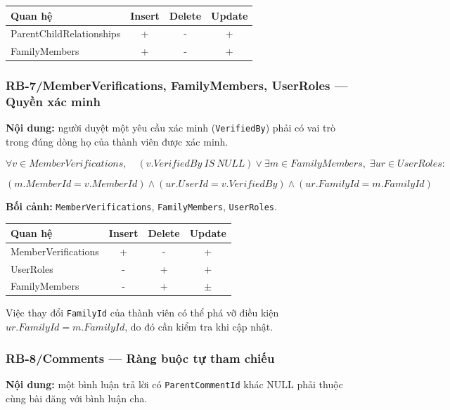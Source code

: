 \begin{center}
\begin{tabular}{@{}lccc@{}}
\toprule
\textbf{Quan hệ} & \textbf{Insert} & \textbf{Delete} & \textbf{Update}\\
\midrule
ParentChildRelationships & + & - & +\\
FamilyMembers & + & - & +\\
\bottomrule
\end{tabular}
\end{center}

\subsubsection*{RB-7/MemberVerifications, FamilyMembers, UserRoles --- Quyền xác minh}

\textbf{Nội dung:} người duyệt một yêu cầu xác minh (\texttt{VerifiedBy}) phải có vai trò trong đúng dòng họ của thành viên được xác minh.

\[
\forall v\in MemberVerifications,\quad
(v.VerifiedBy\ IS\ NULL)
\lor
\exists m\in FamilyMembers,\;
\exists ur\in UserRoles:
\]

\[
(m.MemberId=v.MemberId)
\land
(ur.UserId=v.VerifiedBy)
\land
(ur.FamilyId=m.FamilyId)
\]

\textbf{Bối cảnh:} \texttt{MemberVerifications}, \texttt{FamilyMembers}, \texttt{UserRoles}.

\begin{center}
\begin{tabular}{@{}lccc@{}}
\toprule
\textbf{Quan hệ} & \textbf{Insert} & \textbf{Delete} & \textbf{Update}\\
\midrule
MemberVerifications & + & - & +\\
UserRoles & - & + & +\\
FamilyMembers & - & + & $\pm$\\
\bottomrule
\end{tabular}
\end{center}

Việc thay đổi \texttt{FamilyId} của thành viên có thể phá vỡ điều kiện $ur.FamilyId=m.FamilyId$, do đó cần kiểm tra khi cập nhật.

\subsubsection*{RB-8/Comments --- Ràng buộc tự tham chiếu}

\textbf{Nội dung:} một bình luận trả lời có \texttt{ParentCommentId} khác NULL phải thuộc cùng bài đăng với bình luận cha.

